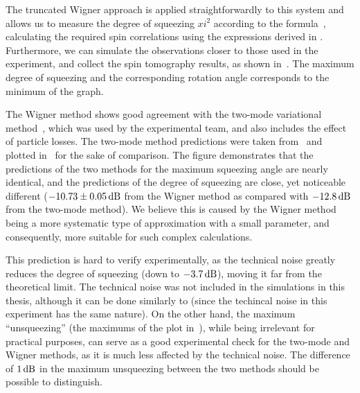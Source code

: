 The truncated Wigner approach is applied straightforwardly to this system and allows us to measure the degree of squeezing $xi^2$ according to the formula~, calculating the required spin correlations using the expressions derived in .
Furthermore, we can simulate the observations closer to those used in the experiment, and collect the spin tomography results, as shown in~.
The maximum degree of squeezing and the corresponding rotation angle corresponds to the minimum of the graph.

The Wigner method shows good agreement with the two-mode variational method~\cite{Li2009}, which was used by the experimental team, and also includes the effect of particle losses.
The two-mode method predictions were taken from~\cite{Riedel2010} and plotted in~ for the sake of comparison.
The figure demonstrates that the predictions of the two methods for the maximum squeezing angle are nearly identical, and the predictions of the degree of squeezing are close, yet noticeable different ($-10.73\pm0.05\mbox{\ensuremath{\,\mathrm{dB}}}$ from the Wigner method as compared with $-12.8\mbox{\ensuremath{\,\mathrm{dB}}}$ from the two-mode method).
We believe this is caused by the Wigner method being a more systematic type of approximation with a small parameter, and consequently, more suitable for such complex calculations.

This prediction is hard to verify experimentally, as the technical noise greatly reduces the degree of squeezing (down to $-3.7\mbox{\ensuremath{\,\mathrm{dB}}}$), moving it far from the theoretical limit.
The technical noise was not included in the simulations in this thesis, although it can be done similarly to  (since the techincal noise in this experiment has the same nature).
On the other hand, the maximum ``unsqueezing'' (the maximums of the plot in~), while being irrelevant for practical purposes, can serve as a good experimental check for the two-mode and Wigner methods, as it is much less affected by the technical noise.
The difference of $1\mbox{\ensuremath{\,\mathrm{dB}}}$ in the maximum unsqueezing between the two methods should be possible to distinguish.

